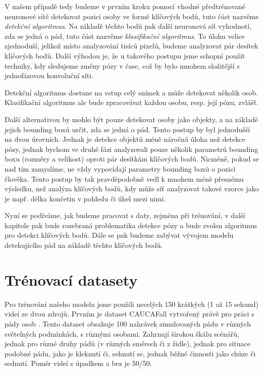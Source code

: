 V našem případě tedy budeme v prvním kroku pomocí vhodné předtrénované
neuronové sítě detekovat pozici osoby ve formě klíčových bodů, tuto část
nazvěme \textit{detekční algoritmus}. Na základě těchto bodů pak další
neuronová síť vyhodnotí, zda se jedná o pád, tuto část nazvěme
\textit{klasifikační algoritmus}. To úlohu velice zjednoduší, jelikož místo
analyzování tisíců pixelů, budeme analyzovat pár desítek klíčových bodů. Další
výhodou je, že u takového postupu jsme schopní použít techniky, kdy sledujeme
změny pózy v čase, což by bylo mnohem složitější s jednofázovou konvoluční
síti.

Detekční algoritmus dostane na vstup celý snímek a může detekovat několik osob.
Klasifikační algoritmus ale bude zpracovávat každou osobu, resp. její pózu,
zvlášť.

Další alternativou by mohlo být pouze detekovat osoby jako objekty, a na
základě jejich bounding boxů určit, zda se jedná o pád. Tento postup by byl
jednodušší na dvou úrovních. Jednak je detekce objektů méně náročná úloha než
detekce pózy, jednak bychom ve druhé fázi analyzovali pouze několik parametrů
bounding boxu (rozměry a velikost) oproti pár desítkám klíčových bodů. Nicméně,
pokud se nad tím zamyslíme, ne vždy vypovídají parametry bounding boxů o pozici
člověka. Tento postup by tak pravděpodobně vedl k mnohem méně přesnému
výsledku, než analýza klíčových bodů, kdy může síť analyzovat takové vzorce
jako je např. délka končetin v pohledu či úhel mezi nimi.

Nyní se podíváme, jak budeme pracovat s daty, zejména při trénování, v další
kapitole pak bude rozebraná problematika detekce pózy a bude zvolen algoritmus
pro detekci klíčových bodů. Dále se pak budeme zabývat vývojem modelu
detekujícího pád na základě těchto klíčových bodů.

\section{Trénovací datasety}
\label{sec:TrainingData}

Pro trénování našeho modelu jsme použili necelých 150 krátkých (1 až 15 sekund)
videí ze dvou zdrojů. Prvním je dataset CAUCAFall vytvořený právě pro práci s
pády osob \cite{caucafall}. Tento dataset obsahuje 100 nahrávek simulovaných
pádu v různých světelných podmínkách, s různými osobami. Zahrnují širokou škálu
scénářů, jednak pro různé druhy pádů (v různých směrech či z židle), jednak pro
situace podobné pádu, jako je kleknutí či, sehnutí se, jednak běžné činnosti
jako chůze či sednutí. Poměr videí s úpadkem a bez je 50/50.

